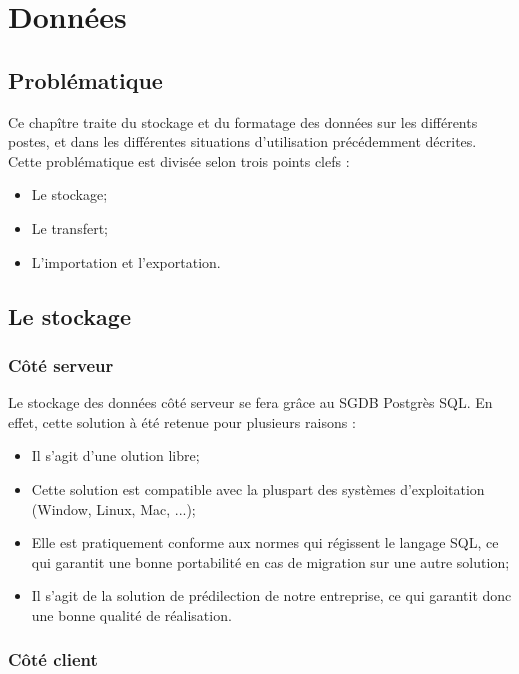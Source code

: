 \section{Données}

% 

\subsection{Problématique}

Ce chapître traite du stockage et du formatage des données sur les différents postes, et dans les différentes situations d'utilisation précédemment décrites.
Cette problématique est divisée selon trois points clefs :
\begin{itemize}
	\item Le stockage;
	\item Le transfert;
	\item L'importation et l'exportation.
\end{itemize}

\subsection{Le stockage}

\subsubsection{Côté serveur}

Le stockage des données côté serveur se fera grâce au SGDB Postgrès SQL. En effet, cette solution à été retenue pour plusieurs raisons :
\begin{itemize}
	\item Il s'agit d'une olution libre;
	\item Cette solution est compatible avec la pluspart des systèmes d'exploitation (Window, Linux, Mac, ...);
	\item Elle est pratiquement conforme aux normes qui régissent le langage SQL, ce qui garantit une bonne portabilité en cas de migration sur une autre solution;
	\item Il s'agit de la solution de prédilection de notre entreprise, ce qui garantit donc une bonne qualité de réalisation.
\end{itemize}

\subsubsection{Côté client}

